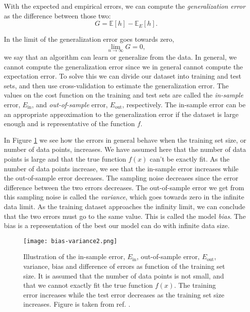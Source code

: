 \documentclass[a4paper, american, 12pt]{report}
\begin{document}
	With the expected and empirical errors, we can compute the \textit{generalization error} as the difference between those two:
	\begin{equation}
	\label{eq:Gen_error}
		G=\mathds{E}[h]-\mathds{E}_E[h].
	\end{equation}

	In the limit of the generalization error goes towards zero,
	\begin{equation*}
		\lim_{n\rightarrow\infty} G=0,
	\end{equation*}
	we say that an algorithm can learn or generalize from the data. In general, we cannot compute the generalization error since we in general cannot compute the expectation error. To solve this we can divide our dataset into training and test sets, and then use cross-validation to estimate the generalization error. The values on the cost function on the training and test sets are called the \textit{in-sample} error, $E_{\text{in}}$, and \textit{out-of-sample} error, $E_{\text{out}}$, respectively. The in-sample error can be an appropriate approximation to the generalization error if the dataset is large enough and is representative of the function $f$.
	
	In Figure \ref{fig:Bias-variance} we see how the errors in general behave when the training set size, or number of data points, increases. We have assumed here that the number of data points is large and that the true function $f(x)$ can't be exactly fit. As the number of data points increase, we see that the in-sample error increases while the out-of-sample error decreases. The sampling noise decreases since the error difference between the two errors decreases. The out-of-sample error we get from this sampling noise is called the \textit{variance}, which goes towards zero in the infinite data limit. As the training dataset approaches the infinity limit, we can conclude that the two errors must go to the same value. This is called the model \textit{bias}. The bias is a representation of the best our model can do with infinite data size.
	\begin{figure}[ht!]
		\centering\texttt{[image: bias-variance2.png]}
		\caption[In-sample and out-of-sample error as function of training set size.]{Illustration of the in-sample error, $E_{\text{in}}$, out-of-sample error, $E_{\text{out}}$, variance, bias and difference of errors as function of the training set size. It is assumed that the number of data points is not small, and that we cannot exactly fit the true function $f(x)$. The training error increases while the test error decreases as the training set size increases. Figure is taken from ref. \citet{mehta2019high}. \label{fig:Bias-variance}}
	\end{figure} 
	
\end{document}
